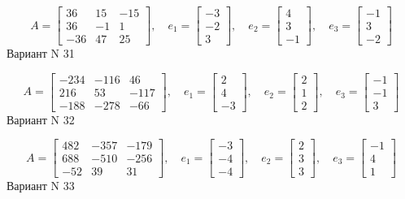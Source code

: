 \documentclass[11pt]{report}
\begin{document}
$$A = \left[\begin{matrix}36 & 15 & -15\\36 & -1 & 1\\-36 & 47 & 25\end{matrix}\right],\quad e_1 = \left[\begin{matrix}-3\\-2\\3\end{matrix}\right],\quad e_2 = \left[\begin{matrix}4\\3\\-1\end{matrix}\right],\quad e_3 = \left[\begin{matrix}-1\\3\\-2\end{matrix}\right]$$Вариант N 31

$$A = \left[\begin{matrix}-234 & -116 & 46\\216 & 53 & -117\\-188 & -278 & -66\end{matrix}\right],\quad e_1 = \left[\begin{matrix}2\\4\\-3\end{matrix}\right],\quad e_2 = \left[\begin{matrix}2\\1\\2\end{matrix}\right],\quad e_3 = \left[\begin{matrix}-1\\-1\\3\end{matrix}\right]$$Вариант N 32

$$A = \left[\begin{matrix}482 & -357 & -179\\688 & -510 & -256\\-52 & 39 & 31\end{matrix}\right],\quad e_1 = \left[\begin{matrix}-3\\-4\\-4\end{matrix}\right],\quad e_2 = \left[\begin{matrix}2\\3\\3\end{matrix}\right],\quad e_3 = \left[\begin{matrix}-1\\4\\1\end{matrix}\right]$$Вариант N 33
\end{document}
